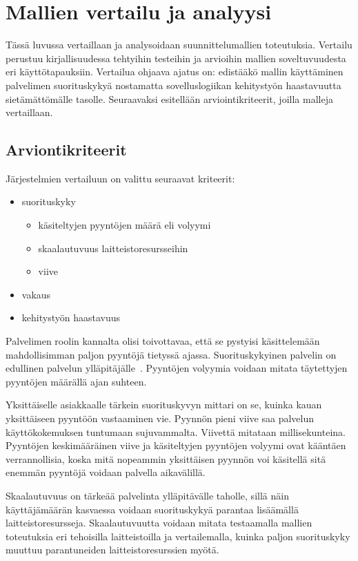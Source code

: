 \documentclass[finnish]{tktltiki2}%
\theoremstyle{definition}
\theoremstyle{remark}
\begin{document}
\section{Mallien vertailu ja analyysi}\label{sec:vertailu}
Tässä luvussa vertaillaan ja analysoidaan
suunnittelumallien toteutuksia.
Vertailu perustuu kirjallisuudessa
tehtyihin testeihin ja arvioihin
mallien soveltuvuudesta eri
käyttötapauksiin.
Vertailua ohjaava ajatus on:
edistääkö mallin käyttäminen palvelimen
suorituskykyä 
nostamatta sovelluslogiikan kehitystyön haastavuutta
sietämättömälle tasolle.
Seuraavaksi esitellään arviointikriteerit,
joilla malleja vertaillaan.
\subsection{Arviontikriteerit}


Järjestelmien vertailuun on valittu seuraavat kriteerit:
\begin{itemize}
  \item suorituskyky
    \begin{itemize}
      \item käsiteltyjen pyyntöjen määrä eli volyymi
      \item skaalautuvuus laitteistoresursseihin
      \item viive
    \end{itemize}
  \item vakaus
  \item kehitystyön haastavuus
\end{itemize}


Palvelimen roolin kannalta olisi toivottavaa, että
se pystyisi käsittelemään mahdollisimman paljon pyyntöjä
tietyssä ajassa.
Suorituskykyinen palvelin on edullinen
palvelun ylläpitäjälle~\cite{pai_flash_1999}.
Pyyntöjen volyymia voidaan
mitata täytettyjen pyyntöjen määrällä ajan suhteen.

Yksittäiselle asiakkaalle tärkein suorituskyvyn mittari on se, kuinka kauan
yksittäiseen pyyntöön vastaaminen vie.
Pyynnön pieni viive saa
palvelun käyttökokemuksen tuntumaan sujuvammalta.
Viivettä mitataan millisekunteina.
Pyyntöjen keskimääräinen viive ja käsiteltyjen pyyntöjen
volyymi ovat kääntäen verrannollisia, koska
mitä nopeammin yksittäisen pyynnön voi käsitellä sitä
enemmän pyyntöjä voidaan palvella aikavälillä.

Skaalautuvuus on tärkeää palvelinta ylläpitävälle taholle, sillä
näin käyttäjämäärän kasvaessa voidaan suorituskykyä parantaa
lisäämällä laitteistoresursseja. Skaalautuvuutta voidaan
mitata testaamalla mallien toteutuksia eri tehoisilla laitteistoilla
ja vertailemalla, kuinka paljon suorituskyky muuttuu 
parantuneiden laitteistoresurssien myötä.
\end{document}
